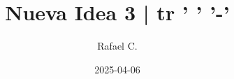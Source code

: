 \documentclass[10pt,
 article,
 amsmath,amssymb
]{revtex4-2}
\begin{document}
\title{Nueva Idea 3 | tr ' ' '-'}



\author{Rafael C.}




\date{2025-04-06}







\maketitle

\tableofcontents
\end{document}
